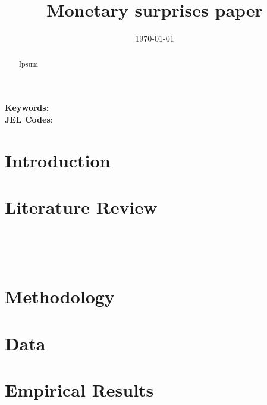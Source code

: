 \documentclass[
  letterpaper,
  DIV=11,
  numbers=noendperiod]{scrartcl}
\author{}
\date{}
\begin{document}
\title{Monetary surprises paper}


\date{\today}
\maketitle

\begin{abstract}

Ipsum

\end{abstract}

\noindent\textbf{Keywords}: 
\\
\textbf{JEL Codes}: 
\newpage

\section{Introduction}\label{introduction}

\section{Literature Review}\label{literature-review}

\citet{gurkaynak2005a}\strut \\
\citet{ho2021}\strut \\
\citet{gurkaynak2005}

\section{Methodology}\label{methodology}

\section{Data}\label{data}

\section{Empirical Results}\label{empirical-results}
\end{document}

